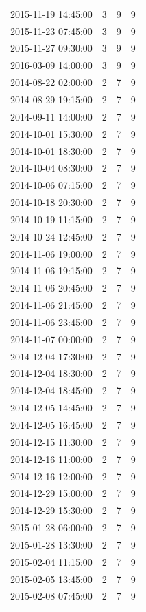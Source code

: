 \begin{tabular}{lrrr}
2015-11-19 14:45:00 & 3 & 9 & 9 \\
2015-11-23 07:45:00 & 3 & 9 & 9 \\
2015-11-27 09:30:00 & 3 & 9 & 9 \\
2016-03-09 14:00:00 & 3 & 9 & 9 \\
2014-08-22 02:00:00 & 2 & 7 & 9 \\
2014-08-29 19:15:00 & 2 & 7 & 9 \\
2014-09-11 14:00:00 & 2 & 7 & 9 \\
2014-10-01 15:30:00 & 2 & 7 & 9 \\
2014-10-01 18:30:00 & 2 & 7 & 9 \\
2014-10-04 08:30:00 & 2 & 7 & 9 \\
2014-10-06 07:15:00 & 2 & 7 & 9 \\
2014-10-18 20:30:00 & 2 & 7 & 9 \\
2014-10-19 11:15:00 & 2 & 7 & 9 \\
2014-10-24 12:45:00 & 2 & 7 & 9 \\
2014-11-06 19:00:00 & 2 & 7 & 9 \\
2014-11-06 19:15:00 & 2 & 7 & 9 \\
2014-11-06 20:45:00 & 2 & 7 & 9 \\
2014-11-06 21:45:00 & 2 & 7 & 9 \\
2014-11-06 23:45:00 & 2 & 7 & 9 \\
2014-11-07 00:00:00 & 2 & 7 & 9 \\
2014-12-04 17:30:00 & 2 & 7 & 9 \\
2014-12-04 18:30:00 & 2 & 7 & 9 \\
2014-12-04 18:45:00 & 2 & 7 & 9 \\
2014-12-05 14:45:00 & 2 & 7 & 9 \\
2014-12-05 16:45:00 & 2 & 7 & 9 \\
2014-12-15 11:30:00 & 2 & 7 & 9 \\
2014-12-16 11:00:00 & 2 & 7 & 9 \\
2014-12-16 12:00:00 & 2 & 7 & 9 \\
2014-12-29 15:00:00 & 2 & 7 & 9 \\
2014-12-29 15:30:00 & 2 & 7 & 9 \\
2015-01-28 06:00:00 & 2 & 7 & 9 \\
2015-01-28 13:30:00 & 2 & 7 & 9 \\
2015-02-04 11:15:00 & 2 & 7 & 9 \\
2015-02-05 13:45:00 & 2 & 7 & 9 \\
2015-02-08 07:45:00 & 2 & 7 & 9 \\

\end{tabular}
